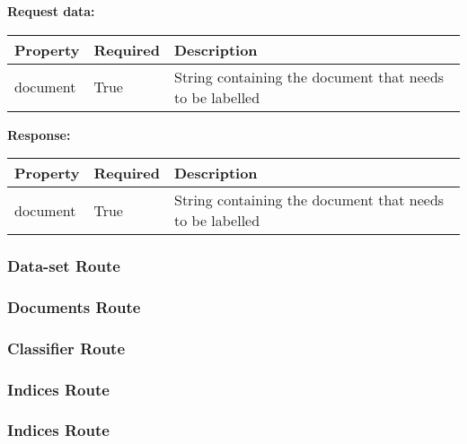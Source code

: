 \begin{enumerate}
\textbf{Request data:}\\

\begin{tabular}{ | l | l | l |}
\hline
Property & Required & Description\\ \hline
document & True & String containing the document that needs to be labelled\\ \hline
\end{tabular}

\textbf{Response:}
\newline
\newline
\begin{tabular}{ | l | l | l |}
\hline
Property & Required & Description\\ \hline
document & True & String containing the document that needs to be labelled\\ \hline
\end{tabular}

\end{enumerate}



\subsubsection{Data-set Route}
\subsubsection{Documents Route}
\subsubsection{Classifier Route}
\subsubsection{Indices Route}
\subsubsection{Indices Route}